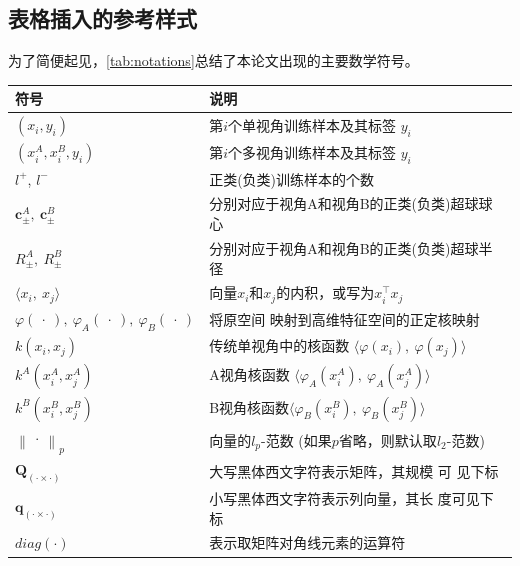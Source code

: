 \documentclass[twoside,zihao=-4,UTF8]{bjfu}
\begin{document}
\subsection{表格插入的参考样式}
为了简便起见，\autoref{tab:notations}总结了本论文出现的主要数学符号。
\begin{table}[h]
	\renewcommand\arraystretch{1.25}
	\centering
	\label{tab:notations}
	\begin{tabular}{p{160pt}p{260pt}}
		\toprule[1.2pt]
		\textbf{符号} & \textbf{说明} \\
		\midrule
		$(x_{i}, y_{i})$ & 第$i$个单视角训练样本及其标签 $y_{i}$\\
		$(x_{i}^{A}, x_{i}^{B}, y_{i})$ & 第$i$个多视角训练样本及其标签 $y_{i}$\\
		$l^{+}$, $l^{-}$ & 正类(负类)训练样本的个数 \\
		$\boldsymbol{c}_{\pm}^{A},  \  \boldsymbol{c}_{\pm}^{B}$ & 
		分别对应于视角A和视角B的正类(负类)超球球心 \\
		$R_{\pm}^{A} , \ R_{\pm}^{B} $ & 
		分别对应于视角A和视角B的正类(负类)超球半径 \\
		$ \langle x_{i}, \ x_{j} \rangle$ & 
		向量$x_{i}$和$x_{j}$的内积，或写为$x_{i}^{\top}x_{j}$ \\
		$\varphi( \ \cdot \ ), \  \varphi_{A}( \ \cdot \ ), \   \varphi_{B}( \ 
		\cdot \ )$  & 将原空间
		映射到高维特征空间的正定核映射 \\
		$k(x_{i}, x_{j})$ & 传统单视角中的核函数 $ \langle 
		\varphi(x_{i}), \ \varphi(x_{j}) \rangle$ \\
		$k^{A}(x_{i}^{A}, x_{j}^{A})$ & A视角核函数 $ \langle 
		\varphi_{A}(x_{i}^{A}), \ \varphi_{A}(x_{j}^{A}) \rangle$\\
		$ k^{B}(x_{i}^{B}, x_{j}^{B})$ & 
		B视角核函数$ \langle
		\varphi_{B}(x_{i}^{B}), \ \varphi_{B}(x_{j}^{B}) \rangle $\\
		$\left\| \ \cdot \ \right\|_{p}$ & 向量的$l_p$-范数 
		(如果$p$省略，则默认取$l_2$-范数) \\
		$\boldsymbol{Q}_{(\cdot \times \cdot)}$ & 大写黑体西文字符表示矩阵，其规模
		可
		见下标 \\
		$\boldsymbol{q}_{(\cdot \times \cdot)}$ & 小写黑体西文字符表示列向量，其长
		度可见下标 \\
		$diag(\cdot)$ & 表示取矩阵对角线元素的运算符\\
		\bottomrule[1.2pt]
	\end{tabular}
\end{table}
\end{document}
